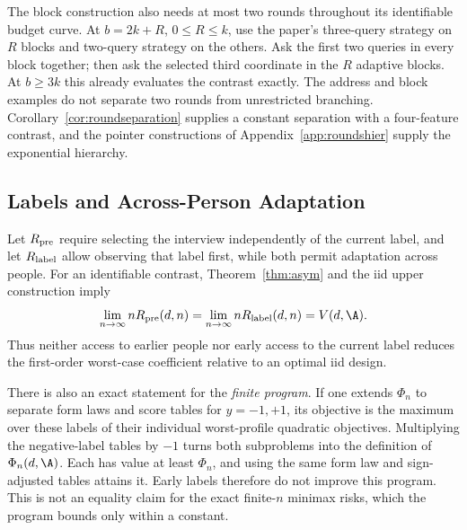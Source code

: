 The block construction also needs at most two rounds throughout its identifiable budget curve. At $b=2k+R$, $0\le R\le k$, use the paper's three-query strategy on $R$ blocks and two-query strategy on the others. Ask the first two queries in every block together; then ask the selected third coordinate in the $R$ adaptive blocks. At $b\ge3k$ this already evaluates the contrast exactly. The address and block examples do not separate two rounds from unrestricted branching. Corollary~\ref{cor:roundseparation} supplies a constant separation with a four-feature contrast, and the pointer constructions of Appendix~\ref{app:roundshier} supply the exponential hierarchy.

\subsection{Labels and Across-Person Adaptation}
Let $R_{\rm pre}$ require selecting the interview independently of the current label, and let $R_{\rm label}$ allow observing that label first, while both permit adaptation across people. For an identifiable contrast, Theorem~\ref{thm:asym} and the iid upper construction imply
\[
 \lim_{n\to\infty}nR_{\rm pre}(d,n)
 =\lim_{n\to\infty}nR_{\rm label}(d,n)=V(d,\A).
\]
Thus neither access to earlier people nor early access to the current label reduces the first-order worst-case coefficient relative to an optimal iid design.

There is also an exact statement for the \emph{finite program}. If one extends $\Phi_n$ to separate form laws and score tables for $y=-1,+1$, its objective is the maximum over these labels of their individual worst-profile quadratic objectives. Multiplying the negative-label tables by $-1$ turns both subproblems into the definition of $\Phi_n(d,\A)$. Each has value at least $\Phi_n$, and using the same form law and sign-adjusted tables attains it. Early labels therefore do not improve this program. This is not an equality claim for the exact finite-$n$ minimax risks, which the program bounds only within a constant.



